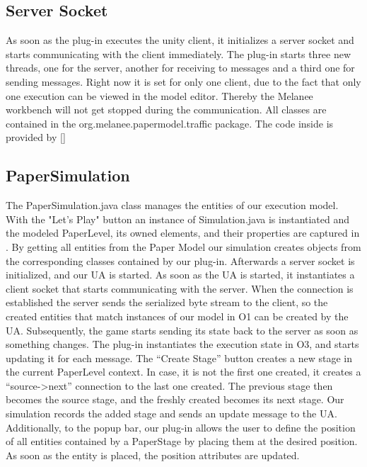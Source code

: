 \subsection{Server Socket}
As soon as the plug-in executes the unity client, it initializes a server socket and starts communicating with the client immediately. The plug-in starts three new threads, one for the server, another for receiving to messages and a third one for sending messages. Right now it is set for only one client, due to the fact that only one execution can be viewed in the model editor. Thereby the Melanee workbench will not get stopped during the communication. All classes are contained in the org.melanee.papermodel.traffic package. The code inside is provided by [\cite{SOC}]

\subsection{PaperSimulation}
The PaperSimulation.java class manages the entities of our execution model. With the "Let’s Play" button an instance of Simulation.java is instantiated and the modeled PaperLevel, its owned elements, and their properties are captured in . By getting all entities from the Paper Model our simulation creates objects from the corresponding classes contained by our plug-in.
Afterwards a server socket is initialized, and our UA is started. As soon as the UA is started, it instantiates a client socket that starts communicating with the server. When the connection is established the server sends the serialized byte stream to the client, so the created entities that match instances of our model in O1 can be created by the UA. Subsequently, the game starts sending its state back to the server as soon as something changes. The plug-in instantiates the execution state in O3, and starts updating it for each message.
The “Create Stage” button creates a new stage in the current PaperLevel context. In case, it is not the first one created, it creates a “source->next” connection to the last one created. The previous stage then becomes the source stage, and the freshly created becomes its next stage. Our simulation records the added stage and sends an update message to the UA.
Additionally, to the popup bar, our plug-in allows the user to define the position of all entities contained by a PaperStage by placing them at the desired position. As soon as the entity is placed, the position attributes are updated.
